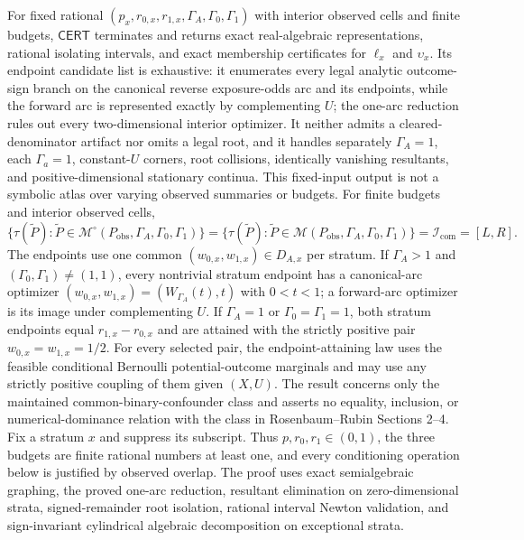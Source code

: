 For fixed rational \((p_x,r_{0,x},r_{1,x},\Gamma_A,\Gamma_0,\Gamma_1)\) with interior observed cells and finite budgets, \(\mathsf{CERT}\) terminates and returns exact real-algebraic representations, rational isolating intervals, and exact membership certificates for \(\ell_x\) and \(\upsilon_x\).  Its endpoint candidate list is exhaustive: it enumerates every legal analytic outcome-sign branch on the canonical reverse exposure-odds arc and its endpoints, while the forward arc is represented exactly by complementing \(U\); the one-arc reduction rules out every two-dimensional interior optimizer.  It neither admits a cleared-denominator artifact nor omits a legal root, and it handles separately \(\Gamma_A=1\), each \(\Gamma_a=1\), constant-\(U\) corners, root collisions, identically vanishing resultants, and positive-dimensional stationary continua.  This fixed-input output is not a symbolic atlas over varying observed summaries or budgets.
For finite budgets and interior observed cells,
\[
 \{\tau(\widetilde P):\widetilde P\in\mathcal M^{\circ}(P_{\mathrm{obs}},\Gamma_A,\Gamma_0,\Gamma_1)\}
 =\{\tau(\widetilde P):\widetilde P\in\mathcal M(P_{\mathrm{obs}},\Gamma_A,\Gamma_0,\Gamma_1)\}
 =\mathcal I_{\mathrm{com}}=[L,R].
\]
The endpoints use one common \((w_{0,x},w_{1,x})\in D_{A,x}\) per stratum.  If \(\Gamma_A>1\) and \((\Gamma_0,\Gamma_1)\neq(1,1)\), every nontrivial stratum endpoint has a canonical-arc optimizer \((w_{0,x},w_{1,x})=(W_{\Gamma_A}(t),t)\) with \(0<t<1\); a forward-arc optimizer is its image under complementing \(U\).  If \(\Gamma_A=1\) or \(\Gamma_0=\Gamma_1=1\), both stratum endpoints equal \(r_{1,x}-r_{0,x}\) and are attained with the strictly positive pair \(w_{0,x}=w_{1,x}=1/2\).  For every selected pair, the endpoint-attaining law uses the feasible conditional Bernoulli potential-outcome marginals and may use any strictly positive coupling of them given \((X,U)\).  The result concerns only the maintained common-binary-confounder class and asserts no equality, inclusion, or numerical-dominance relation with the class in Rosenbaum--Rubin Sections 2--4.
Fix a stratum \(x\) and suppress its subscript.  Thus \(p,r_0,r_1\in(0,1)\), the three budgets are finite rational numbers at least one, and every conditioning operation below is justified by observed overlap.  The proof uses exact semialgebraic graphing, the proved one-arc reduction, resultant elimination on zero-dimensional strata, signed-remainder root isolation, rational interval Newton validation, and sign-invariant cylindrical algebraic decomposition on exceptional strata.

